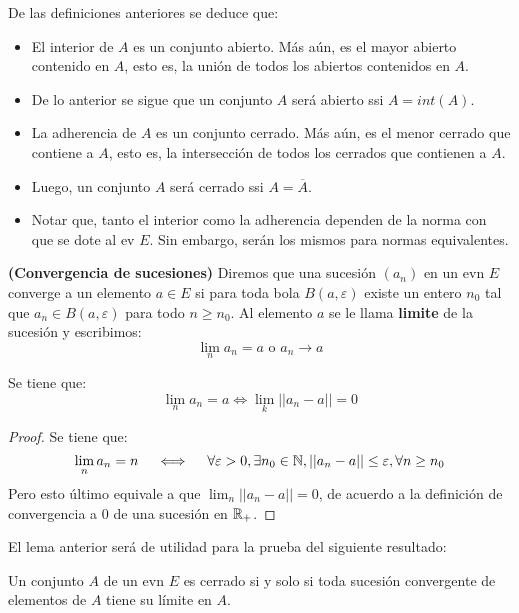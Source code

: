 \begin{nota}
	De las definiciones anteriores se deduce que: 
	\begin{itemize}
		\item El interior de $A$ es un conjunto abierto. Más aún, es el mayor abierto contenido en $A$, esto es, la unión de todos los abiertos contenidos en $A$. 
		\item De lo anterior se sigue que un conjunto $A$ será abierto ssi $A = int(A)$. 
		\item La adherencia de $A$ es un conjunto cerrado. Más aún, es el menor cerrado que contiene a $A$, esto es, la intersección de todos los cerrados que contienen a $A$. 
		\item Luego, un conjunto $A$ será cerrado ssi $A = \overline{A}$. 
		\item Notar que, tanto el interior como la adherencia dependen de la norma con que se dote al ev $E$. Sin embargo, serán los mismos para normas equivalentes. 
	\end{itemize}
\end{nota}

\begin{definicion}
	\textbf{(Convergencia de sucesiones)}
	Diremos que una sucesión $(a_n)$ en un evn $E$ converge a un elemento $a \in E$ si para toda bola $B(a, \varepsilon)$ existe un entero $n_0$ tal que $a_n \in B(a, \varepsilon)$ para todo $n \geq n_0$. Al elemento $a$ se le llama \textbf{limite} de la sucesión y escribimos: 
	$$ \lim_n a_n = a \text{ o } a_n \rightarrow a $$ 
\end{definicion}

\begin{lema}
	Se tiene que: 
	$$ \lim_n a_n = a \iff \lim_k || a_n - a || = 0 $$ 
\end{lema}

\begin{proof}
	Se tiene que: 
	$$ \lim_n a_n = n \quad \iff \quad \forall \varepsilon > 0, \exists n_0 \in \mathbb{N} , || a_n - a || \leq \varepsilon, \forall n \geq n_0 $$   
	Pero esto último equivale a que $\lim_n || a_n - a || = 0 $, de acuerdo a la definición de convergencia a $0$ de una sucesión en $\mathbb{R}_+$.
\end{proof}

El lema anterior será de utilidad para la prueba del siguiente resultado: 

\begin{teorema}
	Un conjunto $A$ de un evn $E$ es cerrado si y solo si toda sucesión convergente de elementos de $A$ tiene su límite en $A$. 
\end{teorema}

